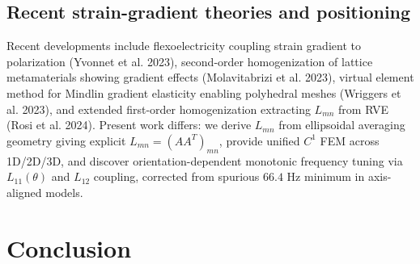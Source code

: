 \documentclass[final,3p,times,fleqn]{elsarticle}
\newcommand{\rev}[1]{\textcolor{revcolor}{#1}}
\begin{document}
\subsection{Recent strain-gradient theories and positioning}
\rev{Recent developments include flexoelectricity coupling strain gradient to polarization (Yvonnet et al. 2023), second-order homogenization of lattice metamaterials showing gradient effects (Molavitabrizi et al. 2023), virtual element method for Mindlin gradient elasticity enabling polyhedral meshes (Wriggers et al. 2023), and extended first-order homogenization extracting $L_{mn}$ from RVE (Rosi et al. 2024). Present work differs: we derive $L_{mn}$ from ellipsoidal averaging geometry giving explicit $L_{mn}=(AA^T)_{mn}$, provide unified $C^1$ FEM across 1D/2D/3D, and discover orientation-dependent monotonic frequency tuning via $L_{11}(\theta)$ and $L_{12}$ coupling, corrected from spurious $66.4$ Hz minimum in axis-aligned models.}

\section{\large{Conclusion}}

\label{sec:conclusion}
\end{document}
